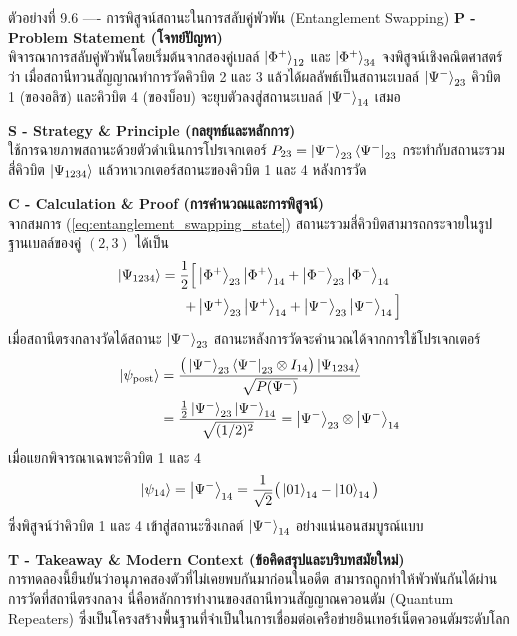 \begin{psctbox}{ตัวอย่างที่ 9.6 ---- การพิสูจน์สถานะในการสลับคู่พัวพัน (Entanglement Swapping)}
\noindent\textbf{P - Problem Statement (โจทย์ปัญหา)} \\
พิจารณาการสลับคู่พัวพันโดยเริ่มต้นจากสองคู่เบลล์ $\ket{\Phi^+}_{12}$ และ $\ket{\Phi^+}_{34}$ จงพิสูจน์เชิงคณิตศาสตร์ว่า เมื่อสถานีทวนสัญญาณทำการวัดคิวบิต 2 และ 3 แล้วได้ผลลัพธ์เป็นสถานะเบลล์ $\ket{\Psi^-}_{23}$ คิวบิต 1 (ของอลิซ) และคิวบิต 4 (ของบ็อบ) จะยุบตัวลงสู่สถานะเบลล์ $\ket{\Psi^-}_{14}$ เสมอ

\vspace{4pt}
\noindent\textbf{S - Strategy \& Principle (กลยุทธ์และหลักการ)} \\
ใช้การฉายภาพสถานะด้วยตัวดำเนินการโปรเจกเตอร์ $P_{23} = \ket{\Psi^-}_{23}\bra{\Psi^-}_{23}$ กระทำกับสถานะรวมสี่คิวบิต $\ket{\Psi_{1234}}$ แล้วหาเวกเตอร์สถานะของคิวบิต 1 และ 4 หลังการวัด

\vspace{4pt}
\noindent\textbf{C - Calculation \& Proof (การคำนวณและการพิสูจน์)} \\
จากสมการ (\ref{eq:entanglement_swapping_state}) สถานะรวมสี่คิวบิตสามารถกระจายในรูปฐานเบลล์ของคู่ $(2, 3)$ ได้เป็น
\begin{align}
\ket{\Psi_{1234}} = \frac{1}{2} \Big[ &\ket{\Phi^+}_{23}\ket{\Phi^+}_{14} + \ket{\Phi^-}_{23}\ket{\Phi^-}_{14} \nonumber \\
+ &\ket{\Psi^+}_{23}\ket{\Psi^+}_{14} + \ket{\Psi^-}_{23}\ket{\Psi^-}_{14} \Big]
\end{align}
เมื่อสถานีตรงกลางวัดได้สถานะ $\ket{\Psi^-}_{23}$ สถานะหลังการวัดจะคำนวณได้จากการใช้โปรเจกเตอร์
\begin{align}
\ket{\psi_{\text{post}}} &= \frac{\big( \ket{\Psi^-}_{23}\bra{\Psi^-}_{23} \otimes I_{14} \big) \ket{\Psi_{1234}}}{\sqrt{P(\Psi^-)}} \nonumber \\
&= \frac{\frac{1}{2} \ket{\Psi^-}_{23} \ket{\Psi^-}_{14}}{\sqrt{(1/2)^2}} = \ket{\Psi^-}_{23} \otimes \ket{\Psi^-}_{14}
\end{align}
เมื่อแยกพิจารณาเฉพาะคิวบิต 1 และ 4
\begin{equation}
\ket{\psi_{14}} = \ket{\Psi^-}_{14} = \frac{1}{\sqrt{2}} \big( \ket{01}_{14} - \ket{10}_{14} \big)
\end{equation}
ซึ่งพิสูจน์ว่าคิวบิต 1 และ 4 เข้าสู่สถานะซิงเกลต์ $\ket{\Psi^-}_{14}$ อย่างแน่นอนสมบูรณ์แบบ

\vspace{4pt}
\noindent\textbf{T - Takeaway \& Modern Context (ข้อคิดสรุปและบริบทสมัยใหม่)} \\
การทดลองนี้ยืนยันว่าอนุภาคสองตัวที่ไม่เคยพบกันมาก่อนในอดีต สามารถถูกทำให้พัวพันกันได้ผ่านการวัดที่สถานีตรงกลาง นี่คือหลักการทำงานของสถานีทวนสัญญาณควอนตัม (Quantum Repeaters) ซึ่งเป็นโครงสร้างพื้นฐานที่จำเป็นในการเชื่อมต่อเครือข่ายอินเทอร์เน็ตควอนตัมระดับโลก
\end{psctbox}


